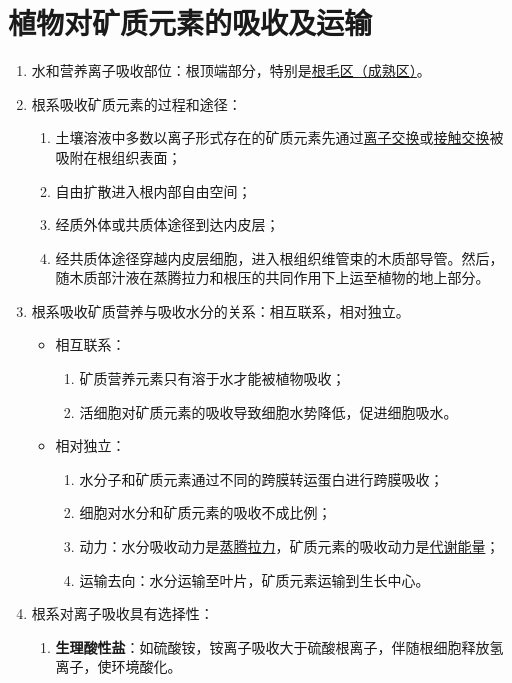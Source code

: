 \section{植物对矿质元素的吸收及运输}
\begin{enumerate}
    \item 水和营养离子吸收部位：根顶端部分，特别是\uline{根毛区（成熟区）}。
    \item 根系吸收矿质元素的过程和途径：
    \begin{enumerate}
        \item 土壤溶液中多数以离子形式存在的矿质元素先通过\uline{离子交换}或\uline{接触交换}被吸附在根组织表面；
        \item 自由扩散进入根内部自由空间；
        \item 经质外体或共质体途径到达内皮层；
        \item 经共质体途径穿越内皮层细胞，进入根组织维管束的木质部导管。然后，随木质部汁液在蒸腾拉力和根压的共同作用下上运至植物的地上部分。
    \end{enumerate}
    \item 根系吸收矿质营养与吸收水分的关系：相互联系，相对独立。
    \begin{itemize}
        \item 相互联系：
        \begin{enumerate}
            \item 矿质营养元素只有溶于水才能被植物吸收；
            \item 活细胞对矿质元素的吸收导致细胞水势降低，促进细胞吸水。
        \end{enumerate}
        \item 相对独立：
        \begin{enumerate}
            \item 水分子和矿质元素通过不同的跨膜转运蛋白进行跨膜吸收；
            \item 细胞对水分和矿质元素的吸收不成比例；
            \item 动力：水分吸收动力是\uline{蒸腾拉力}，矿质元素的吸收动力是\uline{代谢能量}；
            \item 运输去向：水分运输至叶片，矿质元素运输到生长中心。
        \end{enumerate}
    \end{itemize}
    \item 根系对离子吸收具有选择性：
    \begin{enumerate}
        \item \textbf{生理酸性盐}：如硫酸铵，铵离子吸收大于硫酸根离子，伴随根细胞释放氢离子，使环境酸化。

\end{enumerate}
\end{enumerate}

